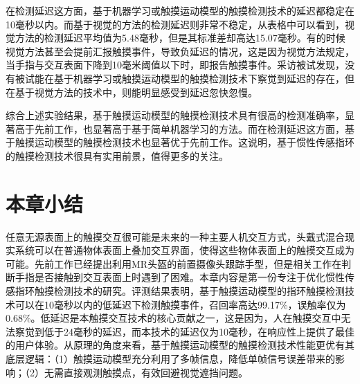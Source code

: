 在检测延迟这方面，基于机器学习或触摸运动模型的触摸检测技术的延迟都稳定在10毫秒以内。而基于视觉的方法的检测延迟则非常不稳定，从表格中可以看到，视觉方法的检测延迟平均值为5.48毫秒，但是其标准差却高达15.07毫秒。有的时候视觉方法甚至会提前汇报触摸事件，导致负延迟的情况，这是因为视觉方法规定，当手指与交互表面下降到10毫米阈值以下时，即报告触摸事件。采访被试发现，没有被试能在基于机器学习或触摸运动模型的触摸检测技术下察觉到延迟的存在，但在基于视觉方法的技术中，则能明显感受到延迟忽快忽慢。

综合上述实验结果，基于触摸运动模型的触摸检测技术具有很高的检测准确率，显著高于先前工作，也显著高于基于简单机器学习的方法。而在检测延迟这方面，基于触摸运动模型的触摸检测技术也显著优于先前工作。这说明，基于惯性传感指环的触摸检测技术很具有实用前景，值得更多的关注。

\section{本章小结}

任意无源表面上的触摸交互很可能是未来的一种主要人机交互方式，头戴式混合现实系统可以在普通物体表面上叠加交互界面，使得这些物体表面上的触摸交互成为可能。先前工作已经提出利用MR头盔的前置摄像头跟踪手型\cite{xiao2018mrtouch}，但是相关工作在判断手指是否接触到交互表面上时遇到了困难。本章内容是第一份专注于优化惯性传感指环触摸检测技术的研究。评测结果表明，基于触摸运动模型的指环触摸检测技术可以在10毫秒以内的低延迟下检测触摸事件，召回率高达99.17\%，误触率仅为0.68\%。低延迟是本触摸交互技术的核心贡献之一，这是因为，人在触摸交互中无法察觉到低于24毫秒的延迟\cite{jota2013fast}，而本技术的延迟仅为10毫秒，在响应性上提供了最佳的用户体验。从原理的角度来看，基于触摸运动模型的触摸检测技术性能更优有其底层逻辑：（1）触摸运动模型充分利用了多帧信息，降低单帧信号误差带来的影响；（2）无需直接观测触摸点，有效回避视觉遮挡问题\cite{xiao2018mrtouch}。
